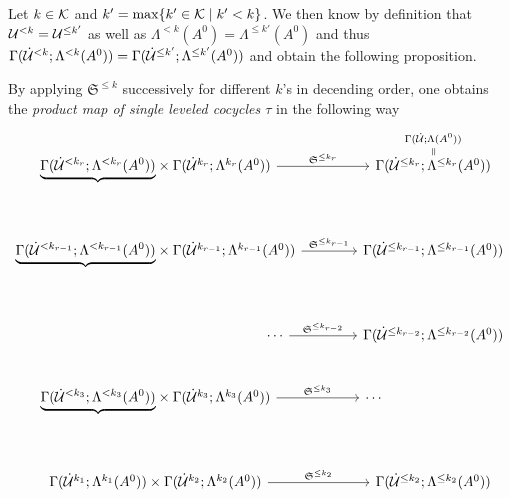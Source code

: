 Let $k\in\mathcal{K}$ and $k'=\max\{k'\in\mathcal{K}\mid k'<k\}$. We then know by definition
that $\mathcal{U}^{<k}=\mathcal{U}^{\leq k'}$ as well as
$\Lambda^{< k}(A^0)=\Lambda^{\leq k'}(A^0)$ and thus
$\Gamma(\dot{\mathcal{U}}^{< k};\Lambda^{< k}(A^0))=
\Gamma(\dot{\mathcal{U}}^{\leq k'};\Lambda^{\leq k'}(A^0))$ and obtain the following
proposition.
\begin{prop}\label{prop:theMapTau}
  By applying $\mathfrak{S}^{\leq k}$ successively for different $k$'s
  in decending order, one obtains the \emph{product map of single leveled
  cocycles $\tau$} in the following way
  \[ \begin{tikzcd}[column sep=1.4cm,row sep=.9cm]
      \underset{\tikzmark{e1}}{\underbrace{%
        \Gamma(\dot\cU^{<k_r};\Lambda^{<k_r}(A^0))}}
      \times
      \Gamma(\dot\cU^{k_r};\Lambda^{k_r}(A^0))
      \rar{\mathfrak{S}^{\leq k_r}}&
      \overset{\Gamma(\dot\cU;\Lambda(A^0))}{%
        \overset{\text{\rotatebox[origin=c]{-90}{$=$}}}{%
          \Gamma(\dot\cU^{\leq k_r};\Lambda^{\leq k_r}(A^0))
      }}
      \\\underset{\tikzmark{e2}}{\underbrace{%
        \Gamma(\dot\cU^{<k_{r-1}};\Lambda^{<k_{r-1}}(A^0))}}
      \times
      \Gamma(\dot\cU^{k_{r-1}};\Lambda^{k_{r-1}}(A^0))
      \rar{\mathfrak{S}^{\leq k_{r-1}}}&
      \overset{\tikzmark{n1}}{%
        \Gamma(\dot\cU^{\leq k_{r-1}};\Lambda^{\leq k_{r-1}}(A^0))}
      \\\hspace{6cm}\cdots \rar{\mathfrak{S}^{\leq k_{r-2}}}&
      \overset{\tikzmark{n2}}{%
        \Gamma(\dot\cU^{\leq k_{r-2}};\Lambda^{\leq k_{r-2}}(A^0))}
      \\\underset{\tikzmark{eEND}}{\underbrace{%
        \Gamma(\dot\cU^{<k_3};\Lambda^{<k_3}(A^0))}}
      \times
      \Gamma(\dot\cU^{k_3};\Lambda^{k_3}(A^0))
      \rar{\mathfrak{S}^{\leq k_3}}&
      \cdots\hspace{3cm}
      \\
      \Gamma(\dot\cU^{k_1};\Lambda^{k_1}(A^0))
      \times
      \Gamma(\dot\cU^{k_2};\Lambda^{k_2}(A^0))
      \rar{\mathfrak{S}^{\leq k_2}}&
      \overset{\tikzmark{nEND}}{%
        \Gamma(\dot\cU^{\leq k_2};\Lambda^{\leq k_2}(A^0))}
  \end{tikzcd} \]
\end{prop}
